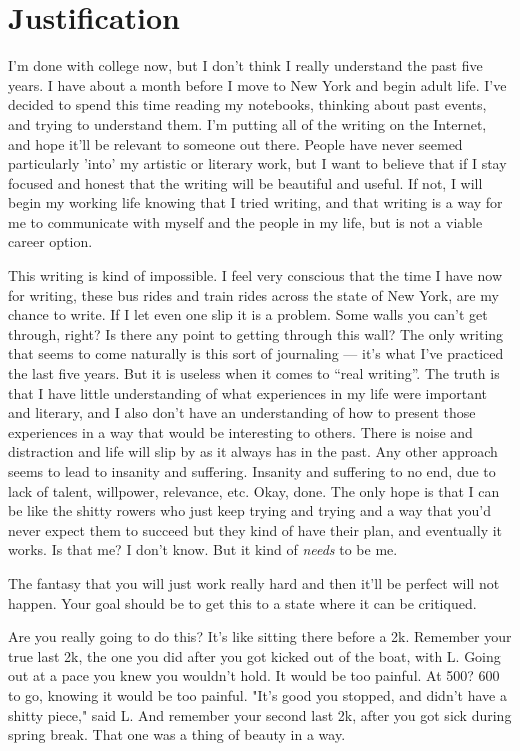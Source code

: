 \documentclass[12pt]{article}
\begin{document}
\section{Justification}
I'm done with college now, but I don't think I really understand the past five
years.  I have about a month before I move to New York and begin adult life.
I've decided to spend this time reading my notebooks, thinking about past
events, and trying to understand them.  I'm putting all of the writing on the
Internet, and hope it'll be relevant to someone out there.  People have never
seemed particularly 'into' my artistic or literary work, but I want to believe
that if I stay focused and honest that the writing will be beautiful and
useful.  If not, I will begin my working life knowing that I tried writing, and
that writing is a way for me to communicate with myself and the people in my
life, but is not a viable career option.

This writing is kind of impossible.  I feel very conscious that the time I have
now for writing, these bus rides and train rides across the state of New York,
are my chance to write.  If I let even one slip it is a problem.  Some walls you
can't get through, right?  Is there any point to getting through this wall?  The
only writing that seems to come naturally is this sort of journaling --- it's
what I've practiced the last five years.  But it is useless when it comes to
``real writing''.  The truth is that I have little understanding of what
experiences in my life were important and literary, and I also don't have an
understanding of how to present those experiences in a way that would be
interesting to others.  There is noise and distraction and life will slip by as
it always has in the past.  Any other approach seems to lead to insanity and
suffering.  Insanity and suffering to no end, due to lack of talent, willpower,
relevance, etc.  Okay, done.  The only hope is that I can be like the shitty
rowers who just keep trying and trying and a way that you'd never expect them to
succeed but they kind of have their plan, and eventually it works.  Is that me?
I don't know.  But it kind of \textit{needs} to be me.

The fantasy that you will just work really hard and then it'll be perfect will
not happen.  Your goal should be to get this to a state where it can be
critiqued.

Are you really going to do this?  It's like sitting there before a 2k.  Remember
your true last 2k, the one you did after you got kicked out of the boat, with
L.  Going out at a pace you knew you wouldn't hold.  It would be too
painful.  At 500?  600 to go, knowing it would be too painful.  "It's good you
stopped, and didn't have a shitty piece," said L.  And remember your second last
2k, after you got sick during spring break.  That one was a thing of beauty in a
way.  
\end{document}
